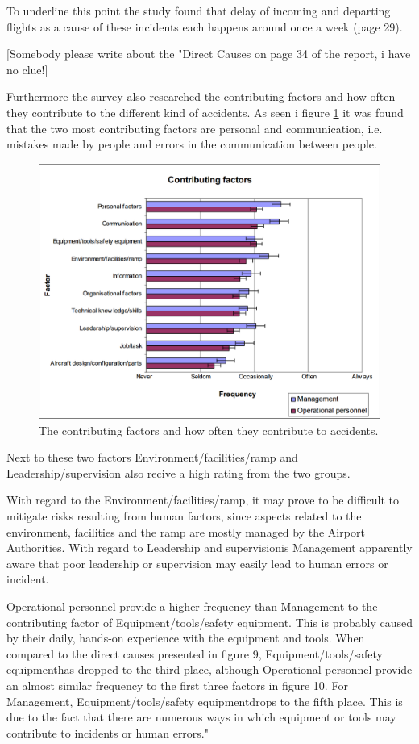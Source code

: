 To underline this point the study found that delay of incoming and departing flights as a cause of these incidents each happens around once a week (page 29).

[Somebody please write about the "Direct Causes on page 34 of the report, i have no clue!]

Furthermore the survey also researched the contributing factors and how often they contribute to the different kind of accidents. As seen i figure \ref{ContributingFactors} it was found that the two most contributing factors are personal and communication, i.e. mistakes made by people and errors in the communication between people.

\begin{figure}[!h]
\centering
\includegraphics[width=\textwidth]{Grafik/ContributingFactors}
\caption{The contributing factors and how often they contribute to accidents.}
\label{ContributingFactors}
\end{figure}

Next to these two factors Environment/facilities/ramp and Leadership/supervision also recive a high rating from the two groups. 

With regard to the Environment/facilities/ramp, it may prove to be difficult to mitigate risks resulting from human factors, since aspects related to the environment, facilities and the ramp are mostly managed by the Airport Authorities. With regard to Leadership and supervisionis Management apparently aware that poor leadership or supervision may easily lead to human errors or incident.

Operational personnel provide a higher frequency than Management to the contributing factor of Equipment/tools/safety equipment. This is probably caused by their daily, hands-on experience with the equipment and tools. When compared to the direct causes presented in figure 9, Equipment/tools/safety equipmenthas dropped to the third place, although Operational personnel provide an almost similar frequency to the first three factors in figure 10. For Management, Equipment/tools/safety equipmentdrops to the fifth place. This is due to the fact that there are numerous ways in which equipment or tools may contribute to incidents or human errors."

